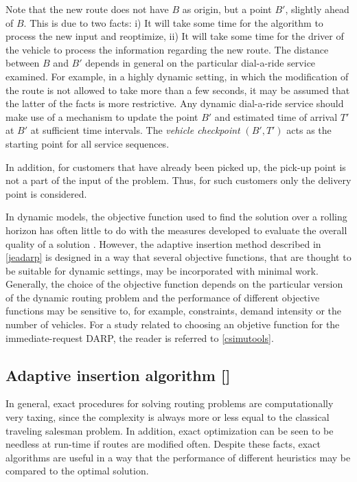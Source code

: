 \documentclass[dissertation,draft*]{aaltoseries}
\begin{document}
Note that the new route does not have $B$ as origin, but
a point $B'$, slightly ahead of $B$. This is due to two facts:
i) It will take some time for the algorithm to process the new input and reoptimize, 
ii) It will take some time for the driver
of the vehicle to process the information regarding the new route. 
The distance between $B$ and $B'$ depends in general on the particular 
dial-a-ride service examined. For example, in a highly dynamic setting,
in which the modification of the route is not
allowed to take more than a few seconds, it may be assumed that
the latter of the facts is more restrictive. 
Any dynamic dial-a-ride
service should make use of a mechanism to update the point $B'$
and estimated time of arrival $T'$ at $B'$ at sufficient time intervals.
The \emph{vehicle checkpoint} $(B',T')$ acts as the starting point for all service sequences.

	In addition, for customers that have already been picked up, the pick-up point 
	is not a part of the input of the problem. Thus, for such customers
	only the delivery point is considered.

	In dynamic models, the objective function
	used to find the solution over a rolling horizon has often little to do with
	the measures developed to evaluate the overall quality of a solution \cite{powell95}.
	However, the adaptive insertion method described in \ref{jeadarp} is designed in a way that several objective 
	functions, that are thought to be suitable
	for dynamic settings, may be incorporated with minimal work.
	Generally, the choice of the objective function depends 
	on the particular version of the dynamic routing problem and the performance
	of different objective functions may be sensitive to, for example, constraints, demand intensity
	or the number of vehicles. For a study related to choosing an objetive function
	for the immediate-request DARP, the reader is referred to \ref{csimutools}.


\subsection{Adaptive insertion algorithm []}
In general, exact procedures for solving routing  
problems are computationally very taxing, since the complexity is always more or 
less equal to the classical traveling salesman problem.
In addition, exact optimization can be seen to be needless at run-time if routes are modified often. 
Despite these facts, exact algorithms are useful in a way that the 
performance of different heuristics may be compared to the optimal solution. 
\end{document}
